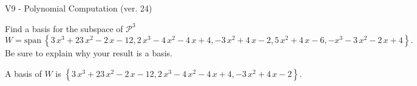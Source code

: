\begin{exercise}
  \begin{exerciseTitle}V9 - Polynomial Computation (ver. 24)\end{exerciseTitle}
  \begin{exerciseStatement}
    Find a basis for the subspace of \(\mathcal{P}^3\) 
\[W=\mathrm{span}\ \left\{3 \, x^{3} + 23 \, x^{2} - 2 \, x - 12 , 2 \, x^{3} - 4 \, x^{2} - 4 \, x + 4 , -3 \, x^{2} + 4 \, x - 2 , 5 \, x^{2} + 4 \, x - 6 , -x^{3} - 3 \, x^{2} - 2 \, x + 4\right\}.\]
 Be sure to explain why your result is a basis.


  \end{exerciseStatement}
  \begin{exerciseAnswer}
   A basis of \(W\) is  \(\left\{3 \, x^{3} + 23 \, x^{2} - 2 \, x - 12 , 2 \, x^{3} - 4 \, x^{2} - 4 \, x + 4 , -3 \, x^{2} + 4 \, x - 2\right\}\).
  


  \end{exerciseAnswer}
\end{exercise}